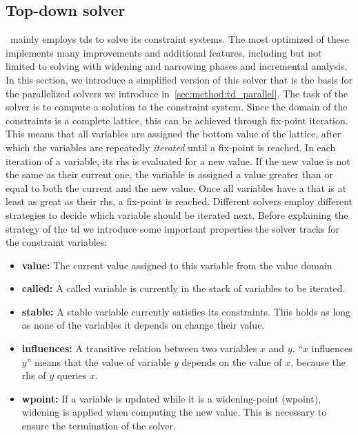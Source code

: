   \subsection{Top-down solver}
  \label{sec:background:td}
  \gob\ mainly employs \acp{td} to solve its constraint systems. The most optimized of these implements many improvements and additional features, including but not limited to solving with widening and narrowing phases and incremental analysis. 
  In this section, we introduce a simplified version of this solver that is the basis for the parallelized solvers we introduce in~\autoref{sec:method:td_parallel}.
  The task of the solver is to compute a solution to the constraint system. Since the domain of the constraints is a complete lattice, this can be achieved through fix-point iteration. This means that all variables are assigned the bottom value of the lattice, after which the variables are repeatedly \textit{iterated} until a fix-point is reached. In each iteration of a variable, its \ac{rhs} is evaluated for a new value. If the new value is not the same as their current one, the variable is assigned a value greater than or equal to both the current and the new value. Once all variables have a that is at least as great as their \ac{rhs}, a fix-point is reached.
  Different solvers employ different strategies to decide which variable should be iterated next. Before explaining the strategy of the \ac{td} we introduce some important properties the solver tracks for the constraint variables:
  \begin{itemize}[leftmargin=*]
    \item \textbf{value:} The current value assigned to this variable from the value domain
    \item \textbf{called:} A called variable is currently in the stack of variables to be iterated.
    \item \textbf{stable:} A stable variable currently satisfies its constraints. This holds as long as none of the variables it depends on change their value.
    \item \textbf{influences:} A transitive relation between two variables $x$ and $y$. ``$x$ influences $y$'' means that the value of variable $y$ depends on the value of $x$, because the \ac{rhs} of $y$ queries $x$.
    \item \textbf{wpoint:} If a variable is updated while it is a widening-point (wpoint), widening is applied when computing the new value. This is necessary to ensure the termination of the solver.
  \end{itemize}
